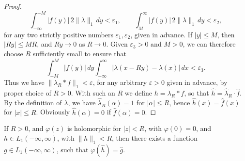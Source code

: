 \begin{proof}
\begin{equation*}
\int_{-\infty}^{-M}|f(y)|\,2\|\lambda\|_1\,dy<\varepsilon_1,\qquad
\int_{M}^{\infty}|f(y)|\,2\|\lambda\|_1\,dy<\varepsilon_2,
\end{equation*}
for any two strictly positive numbers $\varepsilon_1,\varepsilon_2$, given in advance. If $|y|\le M$, then $|Ry|\le MR$, and $Ry\to 0$ as $R\to 0$. Given $\varepsilon_3>0$ and $M>0$, we can therefore choose $R$ sufficiently small to ensure that
\begin{equation*}
\int_{-M}^{M}|f(y)|\,dy\int_{-\infty}^{\infty}|\lambda(x-Ry)-\lambda(x)|\,dx<\varepsilon_3.
\end{equation*}
Thus we have $\|\lambda_R*f\|_1<\varepsilon$, for any arbitrary $\varepsilon>0$ given in advance, by proper choice of $R>0$. With such an $R$ we define $h=\lambda_R*f$, so that $\widehat h=\widehat\lambda_R\cdot\widehat f$. By the definition of $\lambda$, we have $\widehat\lambda_R(\alpha)=1$ for $|\alpha|\le R$, hence $\widehat h(x)=\widehat f(x)$ for $|x|\le R$. Obviously $\widehat h(\alpha)=0$ if $\widehat f(\alpha)=0$.
\end{proof}

\begin{theorem}\label{thm:I-20}
If $R>0$, and $\varphi(z)$ is holomorphic for $|z|<R$, with $\varphi(0)=0$, and $h\in L_1(-\infty,\infty)$, with $\|h\|_1<R$, then there exists a function $g\in L_1(-\infty,\infty)$, such that $\varphi(\widehat h)=\widehat g$.
\end{theorem}

